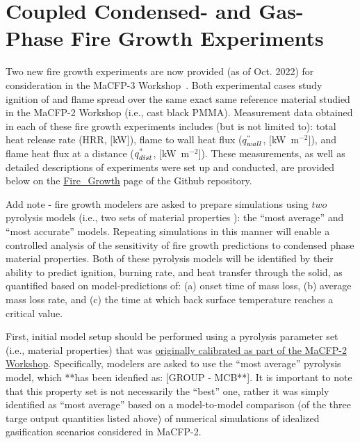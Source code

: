\documentclass[12pt]{article}
\begin{document}
\clearpage
\section{Coupled Condensed- and Gas-Phase Fire Growth Experiments}
\label{Sec:Fire Growth}
Two new fire growth experiments are now provided (as of Oct. 2022) for consideration in the MaCFP-3 Workshop~\cite{chaudhari2021experimental, Leventon2022ParallelPanel}. Both experimental cases study ignition of and flame spread over the same exact same reference material studied in the MaCFP-2 Workshop (i.e., cast black PMMA). Measurement data obtained in each of these fire growth experiments includes (but is not limited to): total heat release rate (HRR, $[$kW$]$), flame to wall heat flux ($q^{``}_{wall}$, $[$kW~m$^{-2}$$]$), and flame heat flux at a distance ($q^{``}_{dist}$, $[$kW~m$^{-2}$$]$). These measurements, as well as detailed descriptions of experiments were set up and conducted, are provided below on the \href{https://github.com/MaCFP/macfp-db/tree/master/Fire_Growth}{Fire\_Growth} page of the Github repository. 

Add note - fire growth modelers are asked to prepare simulations using $two$ pyrolysis models (i.e., two sets of material properties ): the ``most average'' and ``most accurate'' models. Repeating simulations in this manner will enable a controlled analysis of the sensitivity of fire growth predictions to condensed phase material properties. Both of these pyrolysis models will be identified by their ability to predict ignition, burning rate, and heat transfer through the solid, as quantified based on model-predictions of: (a) onset time of mass loss, (b) average mass loss rate, and (c) the time at which back surface temperature reaches a critical value.

First, initial model setup should be performed using a pyrolysis parameter set (i.e., material properties) that was \href{https://github.com/MaCFP/matl-db/tree/master/PMMA/Material_Properties}{originally calibrated as part of the MaCFP-2 Workshop}. Specifically, modelers are asked to use the ``most average'' pyrolysis model, which **has been idenfied as: [GROUP - MCB**]. It is important to note that this property set is not necessarily the ``best'' one, rather it was simply identified as ``most average'' based on a model-to-model comparison (of the three targe output quantities listed above) of numerical simulations of idealized gasification scenarios considered in MaCFP-2.
\end{document}
